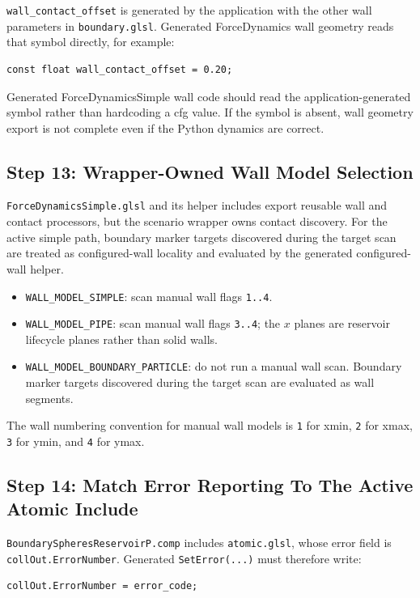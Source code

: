 \texttt{wall\_contact\_offset} is generated by the application with the other
wall parameters in \texttt{boundary.glsl}.  Generated ForceDynamics wall
geometry reads that symbol directly, for example:
\begin{verbatim}
const float wall_contact_offset = 0.20;
\end{verbatim}

Generated ForceDynamicsSimple wall code should read the
application-generated symbol rather than hardcoding a cfg value.  If the
symbol is absent, wall geometry export is not complete even if the Python
dynamics are correct.

\subsection{Step 13: Wrapper-Owned Wall Model Selection}

\texttt{ForceDynamicsSimple.glsl} and its helper includes export reusable
wall and contact processors, but the scenario wrapper owns contact discovery.
For the active simple path, boundary marker targets discovered during the
target scan are treated as configured-wall locality and evaluated by the
generated configured-wall helper.

\begin{itemize}
    \item \texttt{WALL\_MODEL\_SIMPLE}: scan manual wall flags
    \texttt{1..4}.
    \item \texttt{WALL\_MODEL\_PIPE}: scan manual wall flags
    \texttt{3..4}; the \(x\) planes are reservoir lifecycle planes rather
    than solid walls.
    \item \texttt{WALL\_MODEL\_BOUNDARY\_PARTICLE}: do not run a manual wall
    scan.  Boundary marker targets discovered during the target scan are
    evaluated as wall segments.
\end{itemize}

The wall numbering convention for manual wall models is \texttt{1} for xmin,
\texttt{2} for xmax, \texttt{3} for ymin, and \texttt{4} for ymax.

\subsection{Step 14: Match Error Reporting To The Active Atomic Include}

\texttt{BoundarySpheresReservoirP.comp} includes \texttt{atomic.glsl}, whose
error field is \texttt{collOut.ErrorNumber}.  Generated
\texttt{SetError(...)} must therefore write:
\begin{verbatim}
collOut.ErrorNumber = error_code;
\end{verbatim}

